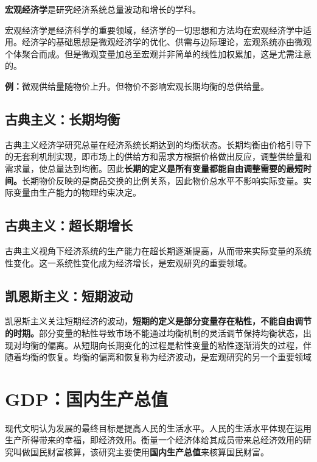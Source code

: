 \documentclass[
  11pt,
  letterpaper,
]{ctexbook}
\begin{document}
\textbf{宏观经济学}是研究经济系统总量波动和增长的学科。

宏观经济学是经济科学的重要领域，经济学的一切思想和方法均在宏观经济学中适用。经济学的基础思想是微观经济学的优化、供需与边际理论，宏观系统亦由微观个体聚合而成。但是微观变量加总至宏观并非简单的线性加权累加，这是尤需注意的。

\textbf{例：}微观供给量随物价上升。但物价不影响宏观长期均衡的总供给量。

\subsection{古典主义：长期均衡}\label{ux53e4ux5178ux4e3bux4e49ux957fux671fux5747ux8861}

古典主义经济学研究总量在经济系统长期达到的均衡状态。长期均衡由价格引导下的无套利机制实现，即市场上的供给方和需求方根据价格做出反应，调整供给量和需求量，使总量达到均衡。因此\textbf{长期的定义是所有变量都能自由调整需要的最短时间。}长期物价反映的是商品交换的比例关系，因此物价总水平不影响实际变量。实际变量由生产能力的物理约束决定。

\subsection{古典主义：超长期增长}\label{ux53e4ux5178ux4e3bux4e49ux8d85ux957fux671fux589eux957f}

古典主义视角下经济系统的生产能力在超长期逐渐提高，从而带来实际变量的系统性变化。这一系统性变化成为经济增长，是宏观研究的重要领域。

\subsection{凯恩斯主义：短期波动}\label{ux51efux6069ux65afux4e3bux4e49ux77edux671fux6ce2ux52a8}

凯恩斯主义关注短期经济的波动，\textbf{短期的定义是部分变量存在粘性，不能自由调节的时期。}部分变量的粘性导致市场不能通过均衡机制的灵活调节保持均衡状态，出现对均衡的偏离。从短期向长期变化的过程是粘性变量的粘性逐渐消失的过程，伴随着均衡的恢复。均衡的偏离和恢复称为经济波动，是宏观研究的另一个重要领域

\section{GDP：国内生产总值}\label{gdpux56fdux5185ux751fux4ea7ux603bux503c}

现代文明认为发展的最终目标是提高人民的生活水平。人民的生活水平体现在运用生产所得带来的幸福，即经济效用。衡量一个经济体给其成员带来总经济效用的研究叫做国民财富核算，该研究主要使用\textbf{国内生产总值}来核算国民财富。
\end{document}
